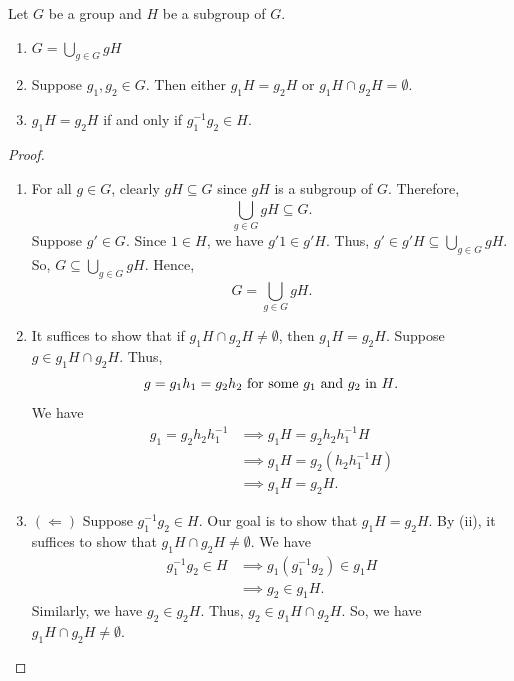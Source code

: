 \begin{theorem}[ ]
    Let \( G  \) be a group and \( H  \) be a subgroup of \( G  \). 
    \begin{enumerate}
        \item[(i)] \( G = \displaystyle \bigcup_{  g \in G  }^{  }  g H  \)
        \item[(ii)] Suppose \( {g}_{1}, {g}_{2} \in G  \). Then either \( {g}_{1} H = {g}_{2} H  \) or \( {g}_{1} H \cap {g}_{2} H = \emptyset \).
        \item[(iii)] \( {g}_{1}H = {g}_{2} H  \) if and only if \( {g}_{1}^{-1} {g}_{2} \in H \).
    \end{enumerate}
\end{theorem}
\begin{proof}
\begin{enumerate}
    \item[(i)] For all \( g \in G  \), clearly \( gH \subseteq  G  \) since \( gH  \) is a subgroup of \( G  \). Therefore, 
        \[  \bigcup_{ g \in G  }^{  }  g H \subseteq  G.  \]
        Suppose \( g' \in G  \). Since \( 1 \in H  \), we have \( g' 1 \in g' H  \). Thus, \( g' \in g' H  \subseteq  \bigcup_{  g \in G  }^{  }  g H \). So, \( G \subseteq  \bigcup_{  g \in G   }^{   }  gH  \). Hence,  
        \[  G = \bigcup_{  g \in G  }^{  }  gH. \]
    \item[(ii)] It suffices to show that if \( {g}_{1} H \cap {g}_{2} H \neq \emptyset \), then \( {g}_{1}H = {g}_{2} H  \). Suppose \( g \in {g}_{1} H \cap {g}_{2} H  \). Thus, 
        \[  g  = {g}_{1} {h}_{1} = {g}_{2} {h}_{2} \ \text{for some \( {g}_{1}  \) and \( {g}_{2} \) in \( H \)}. \]
        We have 
        \begin{align*}
            {g}_{1} = {g}_{2} {h}_{2} {h}_{1}^{-1} &\implies {g}_{1} H = {g}_{2} {h}_{2} {h}_{1}^{-1} H  \\
                                                   &\implies {g}_{1}H = {g}_{2}({h}_{2} {h}_{1}^{-1} H ) \\
                                                   &\implies {g}_{1}H = {g}_{2} H. 
        \end{align*}
    \item[(iii)]  \( (\Longleftarrow) \) Suppose \( {g}_{1}^{-1} {g}_{2} \in H  \). Our goal is to show that \( {g}_{1} H = {g}_{2} H  \). By (ii), it suffices to show that \( {g}_{1} H \cap {g}_{2} H   \neq \emptyset\). We have 
        \begin{align*}
            {g}_{1}^{-1} {g}_{2} \in H &\implies {g}_{1}({g}_{1}^{-1} {g}_{2}) \in {g}_{1} H   \\
                                       &\implies {g}_{2} \in {g}_{1} H.
        \end{align*}
        Similarly, we have \( {g}_{2} \in {g}_{2} H  \). Thus, \( {g}_{2} \in {g}_{1} H \cap {g}_{2} H  \). So, we have \( {g}_{1} H \cap {g}_{2} H \neq \emptyset \).


\end{enumerate}
\end{proof}
